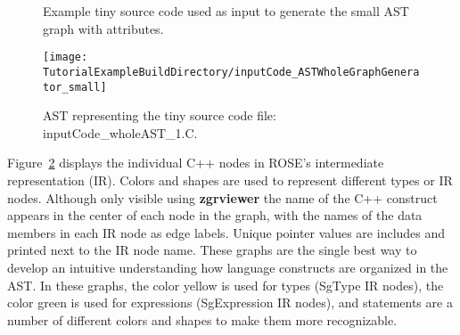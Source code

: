 
\begin{figure}[!h]
{\indent
{\mySmallFontSize

\begin{latexonly}
   
\end{latexonly}

\begin{htmlonly}
   
\end{htmlonly}

}
}
\caption{Example tiny source code used as input to generate the small AST graph with attributes.}
\label{Tutorial:exampleInputCode_ASTGraphGenerator_small}
\end{figure}

\begin{figure}
\texttt{[image: \\TutorialExampleBuildDirectory/inputCode\_ASTWholeGraphGenerator\_small]}
\caption{AST representing the tiny source code file: inputCode\_wholeAST\_1.C.}
\label{tutorial:exampleOutputCodeWholeGraph_small}
\end{figure}

   Figure~\ref{tutorial:exampleOutputCodeWholeGraph_small} displays the individual
C++ nodes in ROSE's intermediate representation (IR).  Colors and shapes are used to 
represent different types or IR nodes. Although only visible using {\bf zgrviewer} 
the name of the C++ construct appears in the center of each node in the graph, with 
the names of the data members in each IR node as edge labels. Unique pointer values
are includes and printed next to the IR node name.  These graphs are the single best
way to develop an intuitive understanding how language constructs are organized
in the AST.  In these graphs, the color yellow is used for types (SgType IR nodes),
the color green is used for expressions (SgExpression IR nodes), and statements
are a number of different colors and shapes to make them more recognizable.


